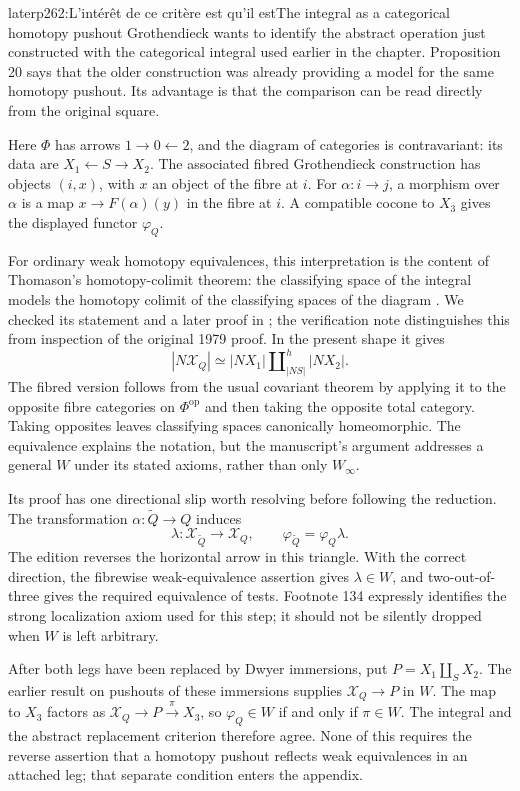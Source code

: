\begin{dcomment}{later}{p262:L'intérêt de ce critère est qu'il est}{The integral as a categorical homotopy pushout}
Grothendieck wants to identify the abstract operation just constructed with the categorical integral used earlier in the chapter. Proposition 20 says that the older construction was already providing a model for the same homotopy pushout. Its advantage is that the comparison can be read directly from the original square.

Here $\Phi$ has arrows $1\to0\leftarrow2$, and the diagram of categories is contravariant: its data are $X_1\leftarrow S\to X_2$. The associated fibred Grothendieck construction has objects $(i,x)$, with $x$ an object of the fibre at $i$. For $\alpha:i\to j$, a morphism over $\alpha$ is a map $x\to F(\alpha)(y)$ in the fibre at $i$. A compatible cocone to $X_3$ gives the displayed functor $\varphi_Q$.

For ordinary weak homotopy equivalences, this interpretation is the content of Thomason's homotopy-colimit theorem: the classifying space of the integral models the homotopy colimit of the classifying spaces of the diagram \citep[Theorem 1.2]{Thomason1979}. We checked its statement and a later proof in \citet[Theorem 26.8 and Corollary 26.9]{ChacholskiScherer2001}; the verification note distinguishes this from inspection of the original 1979 proof. In the present shape it gives
\[
 \left|N\mathcal X_Q\right|
 \simeq |NX_1|\amalg^{h}_{|NS|}|NX_2|.
\]
The fibred version follows from the usual covariant theorem by applying it to the opposite fibre categories on $\Phi^{\mathrm{op}}$ and then taking the opposite total category. Taking opposites leaves classifying spaces canonically homeomorphic. The equivalence explains the notation, but the manuscript's argument addresses a general $W$ under its stated axioms, rather than only $W_\infty$.

Its proof has one directional slip worth resolving before following the reduction. The transformation $\alpha:\tilde Q\to Q$ induces
\[
 \lambda:\mathcal X_{\tilde Q}\longrightarrow\mathcal X_Q,
 \qquad \varphi_{\tilde Q}=\varphi_Q\lambda.
\]
The edition reverses the horizontal arrow in this triangle. With the correct direction, the fibrewise weak-equivalence assertion gives $\lambda\in W$, and two-out-of-three gives the required equivalence of tests. Footnote 134 expressly identifies the strong localization axiom used for this step; it should not be silently dropped when $W$ is left arbitrary.

After both legs have been replaced by Dwyer immersions, put $P=X_1\amalg_SX_2$. The earlier result on pushouts of these immersions supplies $\mathcal X_Q\to P$ in $W$. The map to $X_3$ factors as $\mathcal X_Q\to P\xrightarrow{\pi}X_3$, so $\varphi_Q\in W$ if and only if $\pi\in W$. The integral and the abstract replacement criterion therefore agree. None of this requires the reverse assertion that a homotopy pushout reflects weak equivalences in an attached leg; that separate condition enters the appendix.
\end{dcomment}


